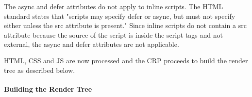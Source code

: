 The async and defer attributes do not apply to inline scripts.
The HTML standard states that "scripts may specify defer or async, but must not specify either unless the src attribute is present." %
Since inline scripts do not contain a src attribute because the source of the script is inside the script tags and not external, the async and defer attributes are not applicable.






HTML, CSS and JS are now processed and the CRP proceeds to build the render tree as described below.












\paragraph{Building the Render Tree} %



